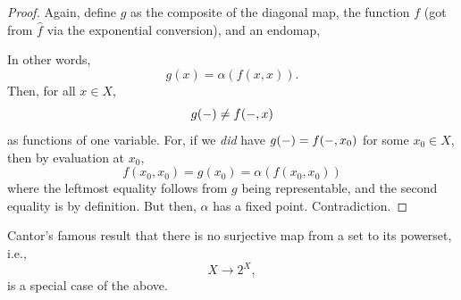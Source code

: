 \documentclass[a4paper]{book}
\theoremstyle{definition}
\theoremstyle{definition}
\theoremstyle{definition}
\theoremstyle{theorem}
\theoremstyle{definition}
\begin{document}
\begin{proof}
	Again, define $g$ as the composite of the diagonal map, the function $f$ (got from $\hat{f}$ via the exponential conversion), and an endomap, 
	\begin{center}
	\end{center}  
	In other words, 
	\begin{equation*}
	g(x) = \alpha(f(x,x)).
	\end{equation*}
	Then, for all $x \in X$, 
	\begin{equation*}
	g(\--) \neq f(\--, x)
	\end{equation*}
	as functions of one variable. For, if we \textit{did} have $g(\--) = f(\--, x_0)$ for some $x_0 \in X$, then by evaluation at $x_0$, 
	\begin{equation*}
	f(x_0, x_0) = g(x_0) = \alpha(f(x_0, x_0))
	\end{equation*}
	where the leftmost equality follows from $g$ being representable, and the second equality is by definition. But then, $\alpha$ has a fixed point. Contradiction.  
\end{proof}
Cantor's famous result that there is no surjective map from a set to its powerset, i.e., 
	\begin{equation*}
	X \rightarrow 2^X,
	\end{equation*}
	is a special case of the above.\par 
\end{document}
